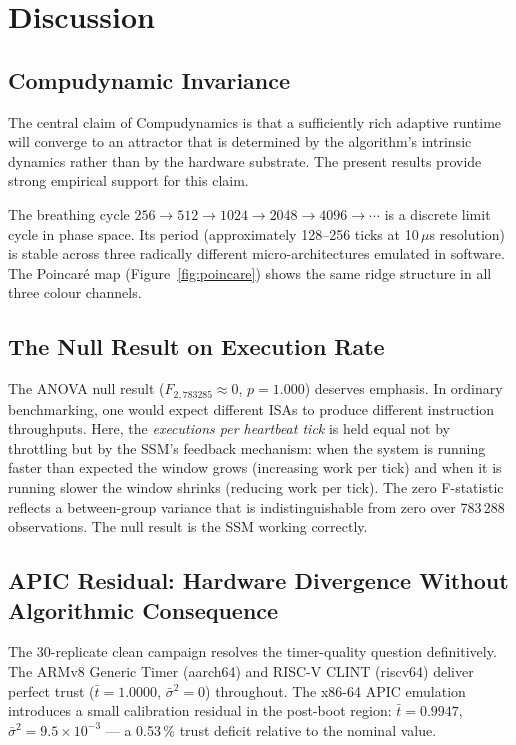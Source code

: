 \documentclass[10pt,a4paper]{article}
\begin{document}
\section{Discussion}
\label{sec:discussion}

\subsection{Compudynamic Invariance}

The central claim of Compudynamics is that a sufficiently rich adaptive runtime
will converge to an attractor that is determined by the algorithm's intrinsic
dynamics rather than by the hardware substrate.  The present results provide
strong empirical support for this claim.

The breathing cycle $256 \to 512 \to 1024 \to 2048 \to 4096 \to \cdots$
is a discrete limit cycle in phase space.  Its period (approximately 128--256
ticks at 10\,\(\mu\)s resolution) is stable across three radically different
micro-architectures emulated in software.  The Poincaré map
(Figure~\ref{fig:poincare}) shows the same ridge structure in all three colour
channels.

\subsection{The Null Result on Execution Rate}

The ANOVA null result ($F_{2,783285}\approx 0$, $p = 1.000$) deserves emphasis.
In ordinary benchmarking, one would expect different ISAs to produce different
instruction throughputs.  Here, the \emph{executions per heartbeat tick} is
held equal not by throttling but by the SSM's feedback mechanism: when the
system is running faster than expected the window grows (increasing work per
tick) and when it is running slower the window shrinks (reducing work per
tick).  The zero F-statistic reflects a between-group variance that is
indistinguishable from zero over 783\,288 observations.  The null result is
the SSM working correctly.

\subsection{APIC Residual: Hardware Divergence Without Algorithmic Consequence}

The 30-replicate clean campaign resolves the timer-quality question definitively.
The ARMv8 Generic Timer (aarch64) and RISC-V CLINT (riscv64) deliver perfect
trust ($\bar{t}=1.0000$, $\bar{\sigma}^2=0$) throughout.  The x86-64 APIC
emulation introduces a small calibration residual in the post-boot region:
$\bar{t}=0.9947$, $\bar{\sigma}^2=9.5\times10^{-3}$ --- a 0.53\,\%
trust deficit relative to the nominal value.
\end{document}
